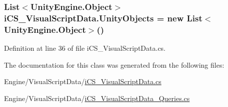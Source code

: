 \hypertarget{classi_c_s___visual_script_data_a95c027c642cf5b55252ff0436727ca37}{
\subsubsection[{Unity\+Objects}]{\setlength{\rightskip}{0pt plus 5cm}List$<${\bf Unity\+Engine.\+Object}$>$ i\+C\+S\+\_\+\+Visual\+Script\+Data.\+Unity\+Objects = new List$<${\bf Unity\+Engine.\+Object}$>$()}}\label{classi_c_s___visual_script_data_a95c027c642cf5b55252ff0436727ca37}


Definition at line 36 of file i\+C\+S\+\_\+\+Visual\+Script\+Data.\+cs.



The documentation for this class was generated from the following files\+:\begin{DoxyCompactItemize}
\item 
Engine/\+Visual\+Script\+Data/\hyperlink{i_c_s___visual_script_data_8cs}{i\+C\+S\+\_\+\+Visual\+Script\+Data.\+cs}\item 
Engine/\+Visual\+Script\+Data/\hyperlink{i_c_s___visual_script_data___queries_8cs}{i\+C\+S\+\_\+\+Visual\+Script\+Data\+\_\+\+Queries.\+cs}\end{DoxyCompactItemize}
